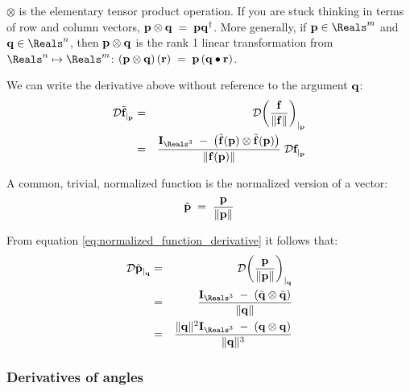 $\otimes$ is the elementary tensor product operation.
If you are stuck thinking in terms of row and column vectors,
${\mathbf p} \otimes {\mathbf q} \;= \;{\mathbf p}{\mathbf q}^\dagger$.
More generally, if $\p \in \Reals^m$ and $\q \in \Reals^n$,
then ${\mathbf p} \otimes {\mathbf q}$ is the rank 1 linear transformation from $\Reals^n \mapsto \Reals^m$:
$\left({\mathbf p} \otimes {\mathbf q}\right) ({\mathbf r}) \;= \;{\mathbf p} \left({\mathbf q} \bullet {\mathbf r}\right)$.

We can write the derivative above without reference to the argument ${\mathbf q}$:
\begin{eqnarray}
\label{eq:normalized_function_derivative}
\Db{\tilde{\f}}{\p}
& = &
\Db{\left({\f \over {\| \f \|}}\right)}{\p}  \\
& = &
{{\I_{\Reals^3} \;- \;\left( \tilde{\f}(\p) \otimes \tilde{\f}(\p) \right) }
\over {\| \f(\p) \|} }
\;\Db{\f}{\p} \nonumber
\end{eqnarray}

A common, trivial, normalized function is the normalized version of
a vector:
\begin{equation}
\tilde{{\mathbf p}} \;= \;{{{\mathbf p}} \over {\| {\mathbf p}\|}}
\end{equation}

From equation \ref{eq:normalized_function_derivative}
it follows that:
\begin{eqnarray}
\label{eq:normalized_vector_derivative}
\Db{\tilde{\p}}{\q}
& = &
\Db{\left({\p \over {\| \p \|}}\right)}{\q}
\\
& = &
{{\I_{\Reals^3} \;- \;\left( \tilde{\q} \otimes \tilde{\q} \right) }
\over {\| \q \|} }
\nonumber
\\
& = &
{{\| \q \|^2 \I_{\Reals^3} \;- \;\left( \q \otimes \q \right) }
\over {\| \q \|^3} }
\nonumber
\end{eqnarray}


\subsubsection{Derivatives of angles}
\label{sec:derivatives-of-angles}


